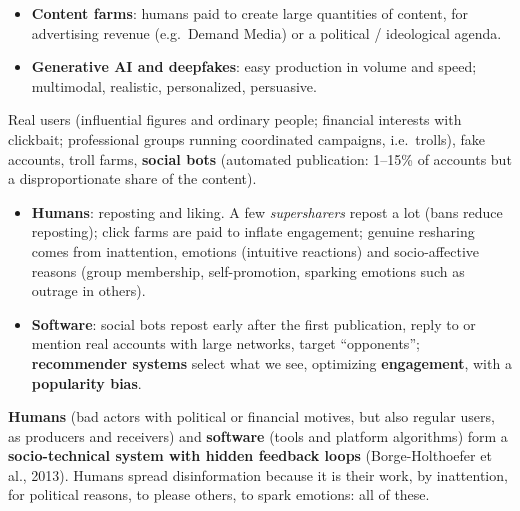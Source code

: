 \documentclass[11pt,a4paper,openany]{book}
\begin{document}
\begin{propbox}[title={Creation}]
\begin{itemize}
  \item \textbf{Content farms}: humans paid to create large quantities of content, for
        advertising revenue (e.g.\ Demand Media) or a political / ideological agenda.
  \item \textbf{Generative AI and deepfakes}: easy production in volume and speed; multimodal,
        realistic, personalized, persuasive.
\end{itemize}
\end{propbox}

\begin{propbox}[title={Publication}]
Real users (influential figures and ordinary people; financial interests with clickbait;
professional groups running coordinated campaigns, i.e.\ trolls), fake accounts, troll farms,
\textbf{social bots} (automated publication: 1--15\% of accounts but a disproportionate share of
the content).
\end{propbox}

\begin{propbox}[title={Propagation}]
\begin{itemize}
  \item \textbf{Humans}: reposting and liking. A few \emph{supersharers} repost a lot (bans
        reduce reposting); click farms are paid to inflate engagement; genuine resharing comes
        from inattention, emotions (intuitive reactions) and socio-affective reasons (group
        membership, self-promotion, sparking emotions such as outrage in others).
  \item \textbf{Software}: social bots repost early after the first publication, reply to or
        mention real accounts with large networks, target ``opponents''; \textbf{recommender
        systems} select what we see, optimizing \textbf{engagement}, with a \textbf{popularity
        bias}.
\end{itemize}
\end{propbox}

\begin{keybox}
\textbf{Humans} (bad actors with political or financial motives, but also regular users, as
producers and receivers) and \textbf{software} (tools and platform algorithms) form a
\textbf{socio-technical system with hidden feedback loops} (Borge-Holthoefer et al., 2013).
Humans spread disinformation because it is their work, by inattention, for political reasons, to
please others, to spark emotions: all of these.
\end{keybox}
\end{document}
